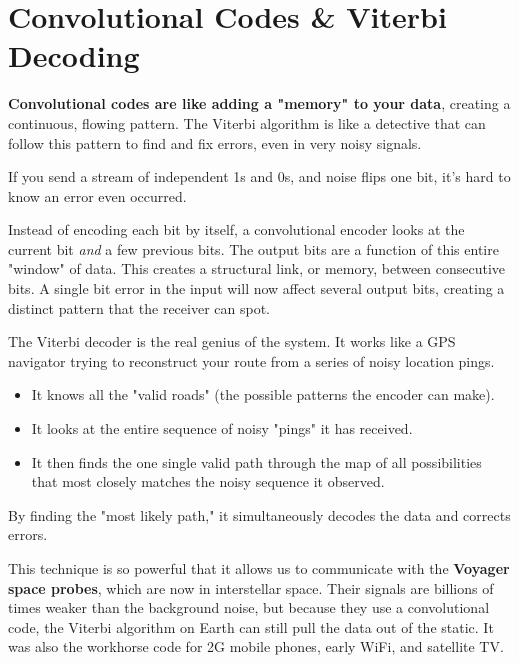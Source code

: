 
\chapter{Convolutional Codes \& Viterbi Decoding}
\label{ch:convolutional-codes}

\begin{nontechnical}
    \textbf{Convolutional codes are like adding a "memory" to your data}, creating a continuous, flowing pattern. The Viterbi algorithm is like a detective that can follow this pattern to find and fix errors, even in very noisy signals.

    If you send a stream of independent 1s and 0s, and noise flips one bit, it's hard to know an error even occurred.

    Instead of encoding each bit by itself, a convolutional encoder looks at the current bit \emph{and} a few previous bits. The output bits are a function of this entire "window" of data. This creates a structural link, or memory, between consecutive bits. A single bit error in the input will now affect several output bits, creating a distinct pattern that the receiver can spot.

    The Viterbi decoder is the real genius of the system. It works like a GPS navigator trying to reconstruct your route from a series of noisy location pings.
    \begin{itemize}
        \item It knows all the "valid roads" (the possible patterns the encoder can make).
        \item It looks at the entire sequence of noisy "pings" it has received.
        \item It then finds the one single valid path through the map of all possibilities that most closely matches the noisy sequence it observed.
    \end{itemize}
    By finding the "most likely path," it simultaneously decodes the data and corrects errors.

     This technique is so powerful that it allows us to communicate with the \textbf{Voyager space probes}, which are now in interstellar space. Their signals are billions of times weaker than the background noise, but because they use a convolutional code, the Viterbi algorithm on Earth can still pull the data out of the static. It was also the workhorse code for 2G mobile phones, early WiFi, and satellite TV.
\end{nontechnical}



